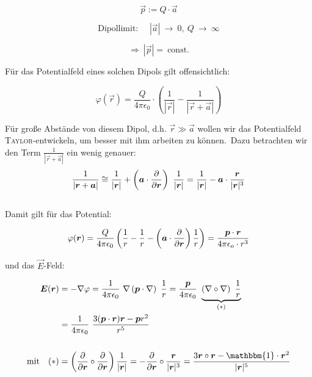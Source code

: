\begin{equation*}
\vec{p} := Q \cdot \vec{a}
\end{equation*}

\begin{equation*}
\text{Dipollimit: } \quad |\vec{a}| \ \rightarrow \ 0, \ Q \ \rightarrow \ \infty 
\end{equation*}

\begin{equation*}
\Rightarrow \ |\vec{p}| = \ \text{const.}
\end{equation*}

Für das Potentialfeld eines solchen Dipols gilt offensichtlich:

\begin{equation*}
\varphi(\vec{r}) = \frac{Q}{4\pi\epsilon_0}\cdot\left(\frac{1}{|\vec{r}|} - \frac{1}{|\vec{r}+\vec{a}|}\right)
\end{equation*}

Für große Abstände von diesem Dipol, d.h. $\vec{r}\gg\vec{a}$ wollen wir das Potentialfeld \textsc{Taylor}-entwickeln, um besser mit ihm arbeiten zu können.\
Dazu betrachten wir den Term $\frac{1}{|\vec{r}+\vec{a}|}$ ein wenig genauer:\\

\begin{equation*}
\frac{1}{|\vec{r}+\vec{a}|} \cong \frac{1}{|\vec{r}|} + \left(\vec{a}\cdot\pdiff{}{\vec{r}}\right) \ \frac{1}{|\vec{r}|} = \frac{1}{|\vec{r}|}-\vec{a}\cdot\frac{\vec{r}}{|\vec{r}|^3}
\end{equation*}
\ \\
Damit gilt für das Potential:

\begin{equation*}
\varphi(\bm{r})=\frac{Q}{4\pi\epsilon_0}\left(\frac{1}{r}-\frac{1}{r}-\left(\bm{a}\cdot\frac{\partial{}}{\partial{\bm{r}}}\right)\frac{1}{r}\right) = \frac{\bm{p}\cdot\bm{r}}{4\pi\epsilon_o\cdot r^3}
\end{equation*}

und das $\vec{E}$-Feld:

\begin{align*}
\vec{E}(\vec{r}) &= - \nabla \varphi = \frac{1}{4\pi\epsilon_0}\ \nabla \left(\vec{p}\cdot\nabla\right)\ \frac{1}{r} = \frac{\vec{p}}{4\pi\epsilon_0}\ \underbrace{\left(\nabla \circ \nabla\right)\ \frac{1}{r}}_{(*)}\\
&= \frac{1}{4\pi\epsilon_0}\ \frac{3(\vec{p}\cdot\vec{r})\vec{r} - \vec{p}r^2}{r^5}\\
\ \\
\text{mit}\quad (*) &= \left(\pdiff{}{\vec{r}} \circ \pdiff{}{\vec{r}}\right)\frac{1}{|\vec{r}|} = - \pdiff{}{\vec{r}}\circ\frac{\vec{r}}{|\vec{r}|^3} = \frac{3\vec{r}\circ\vec{r}-\mathbbm{1}\cdot\vec{r}^2}{|\vec{r}|^5}
\end{align*}
